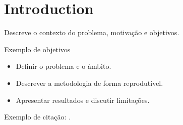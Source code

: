 \section{Introduction}
\label{sec:introduction}

Descreve o contexto do problema, motivação e objetivos.

\begin{exampleblock}{Exemplo de objetivos}
\begin{itemize}
  \item Definir o problema e o âmbito.
  \item Descrever a metodologia de forma reprodutível.
  \item Apresentar resultados e discutir limitações.
\end{itemize}
\end{exampleblock}

Exemplo de citação: \citep{example2020}.
